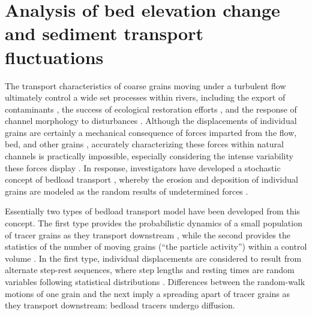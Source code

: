 
\chapter{Analysis of bed elevation change and sediment transport fluctuations}
\label{ch:bedEle}

The transport characteristics of coarse grains moving under a turbulent flow ultimately control a wide set processes within rivers, including the export of contaminants \citep{Malmon2005,Macklin2006}, the success of ecological restoration efforts \citep{Gaeuman2017}, and the response of channel morphology to disturbances \citep{Hassan2017}.
Although the displacements of individual grains are certainly a mechanical consequence of forces imparted from the flow, bed, and other grains \citep{Wiberg1985, Vowinckel2014,Gonzalez2017}, accurately characterizing these forces within natural channels is practically impossible, especially considering the intense variability these forces display \citep{Schmeeckle2007,Celik2010, Dwivedi2011}. In response, investigators have developed a stochastic concept of bedload transport \citep{Einstein1937}, whereby the erosion and deposition of individual grains are modeled as the random results of undetermined forces \citep{Einstein1950,Paintal1971,Ancey2006}.

Essentially two types of bedload transport model have been developed from this concept. 
The first type provides the probabilistic dynamics of a small population of tracer grains as they transport downstream \citep{Einstein1937,Hubbell1964, Nakagawa1976,Martin2012,Lajeunesse2017,Wu2019}, while the second provides the statistics of the number of moving grains (``the particle activity'') within a control volume \citep{Einstein1950,Ancey2006,Ancey2008,Furbish2012a}.
In the first type, individual displacements are considered to result from alternate step-rest sequences, where step lengths and resting times are random variables following statistical distributions \citep{Einstein1937}. 
Differences between the random-walk motions of one grain and the next imply a spreading apart of tracer grains as they transport downstream: bedload tracers undergo diffusion.

